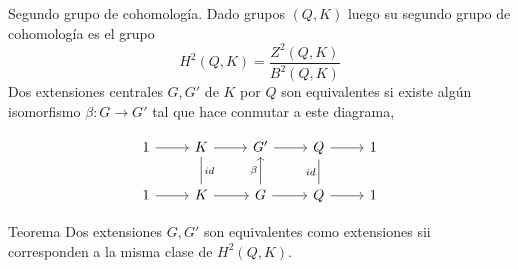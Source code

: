 \documentclass[aspectratio=169, 9pt]{beamer}
\begin{document}
\begin{frame}[fragile]{Segundo grupo de cohomología.}
Dado grupos $(Q,K)$ luego su \alert{segundo grupo de cohomología} es el grupo 
\begin{equation*}
    H^2(Q,K) = \dfrac{Z^2(Q,K)}{B^2(Q,K)}
\end{equation*}
\medskip
\pause
Dos extensiones centrales $G,G'$ de $K$ por $Q$ son equivalentes si existe algún isomorfismo  $\beta:G \to G'$ tal que hace conmutar a este diagrama,

\begin{equation*}
	\begin{tikzcd}
	1 \arrow[r] & K \arrow[r] \arrow[d, "id", no head] & G' \arrow[r]                   & Q \arrow[r] \arrow[d, phantom]       & 1 \\
	1 \arrow[r] & K \arrow[r]                          & G \arrow[u, "\beta"] \arrow[r] & Q \arrow[u, "id", no head] \arrow[r] & 1
	\end{tikzcd}
\end{equation*}



\pause
{}
\begin{alertblock}{Teorema}
Dos extensiones $G,G'$ son equivalentes como extensiones sii corresponden a la misma clase de $H^2(Q,K)$.
\end{alertblock}

\end{frame}
\end{document}
